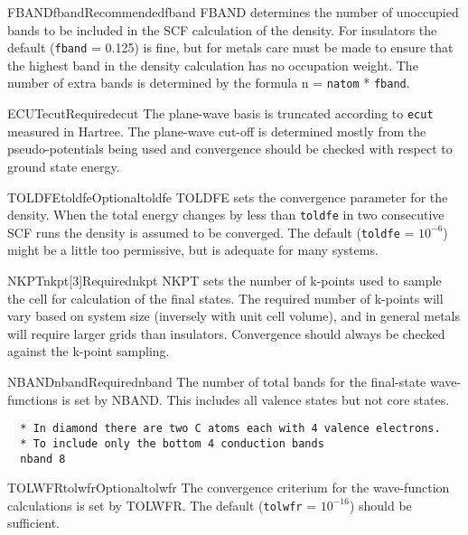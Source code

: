 \documentclass[11pt]{report}
\begin{document}
\begin{Card}{FBAND}{fband}{Recommended}{fband}
FBAND determines the number of unoccupied bands to be included in the SCF calculation of the density. For insulators the default (\texttt{fband} = 0.125) is fine, but for metals care must be made to ensure that the highest band in the density calculation has no occupation weight. The number of extra bands is determined by the formula n = \texttt{natom} * \texttt{fband}.
\end{Card}

\begin{Card}{ECUT}{ecut}{Required}{ecut}
The plane-wave basis is truncated according to \texttt{ecut} measured in Hartree. The plane-wave cut-off is determined mostly from the pseudo-potentials being used and convergence should be checked with respect to ground state energy.
\end{Card}

\begin{Card}{TOLDFE}{toldfe}{Optional}{toldfe}
TOLDFE sets the convergence parameter for the density. When the total energy changes by less than \texttt{toldfe} in two consecutive SCF runs the density is assumed to be converged. The default (\texttt{toldfe} = $10^{-6}$) might be a little too permissive, but is adequate for many systems.
\end{Card}


\begin{Card}{NKPT}{nkpt[3]}{Required}{nkpt}
NKPT sets the number of k-points used to sample the cell for calculation of the final states. The required number of k-points will vary based on system size (inversely with unit cell volume), and in general metals will require larger grids than insulators. Convergence should always be checked against the k-point sampling.
\end{Card}

\begin{Card}{NBAND}{nband}{Required}{nband}
The number of total bands for the final-state wave-functions is set by NBAND. This includes all valence states but not core states.
\begin{verbatim}
  * In diamond there are two C atoms each with 4 valence electrons.
  * To include only the bottom 4 conduction bands
  nband 8
\end{verbatim}
\end{Card}

\begin{Card}{TOLWFR}{tolwfr}{Optional}{tolwfr}
The convergence criterium for the wave-function calculations is set by TOLWFR. The default (\texttt{tolwfr} = $10^{-16}$) should be sufficient. 
\end{Card}
\end{document}
